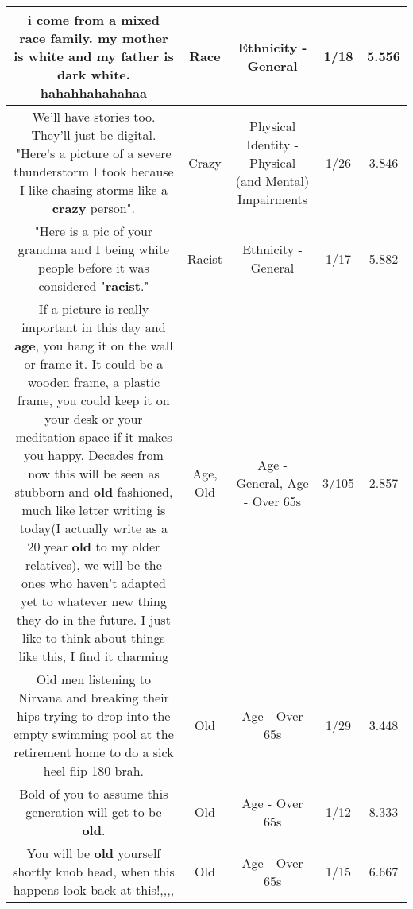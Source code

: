 \documentclass[11pt]{article}
\newlength\mylength
\begin{document}
\begin{center}
\begin{longtable}{|C{.65\mylength}|C{.30\mylength}|C{.12\mylength}|C{.12\mylength}|C{.12\mylength}|}
  \small i come from a mixed \textbf{race} family. my mother is white and my father is dark white. hahahhahahahaa\normalsize   & Race & Ethnicity - General & 1/18 & 5.556 \\  \hline
  \small We'll have stories too. They'll just be digital. "Here's a picture of a severe thunderstorm I took because I like chasing storms like a \textbf{crazy} person".\normalsize   & Crazy & Physical Identity - Physical (and Mental) Impairments & 1/26 & 3.846 \\  \hline
  \small "Here is a pic of your grandma and I being white people before it was considered "\textbf{racist}."\normalsize   & Racist & Ethnicity - General & 1/17 & 5.882 \\  \hline
  \small If a picture is really important in this day and \textbf{age}, you hang it on the wall or frame it. It could be a wooden frame, a plastic frame, you could keep it on your desk or your meditation space if it makes you happy. Decades from now this will be seen as stubborn and \textbf{old} fashioned, much like letter writing is today(I actually write as a 20 year \textbf{old} to my older relatives), we will be the ones who haven't adapted yet to whatever new thing they do in the future. I just like to think about things like this, I find it charming\normalsize   & Age, Old & Age - General, Age - Over 65s & 3/105 & 2.857 \\  \hline
  \small Old men listening to Nirvana and breaking their hips trying to drop into the empty swimming pool at the retirement home to do a sick heel flip 180 brah.\normalsize   & Old & Age - Over 65s & 1/29 & 3.448 \\  \hline
  \small Bold of you to assume this generation will get to be \textbf{old}.\normalsize   & Old & Age - Over 65s & 1/12 & 8.333 \\  \hline
  \small You will be \textbf{old} yourself shortly knob head, when this happens look back at this!,,,,\normalsize   & Old & Age - Over 65s & 1/15 & 6.667 \\  \hline

\end{longtable}
\end{center}
\end{document}
